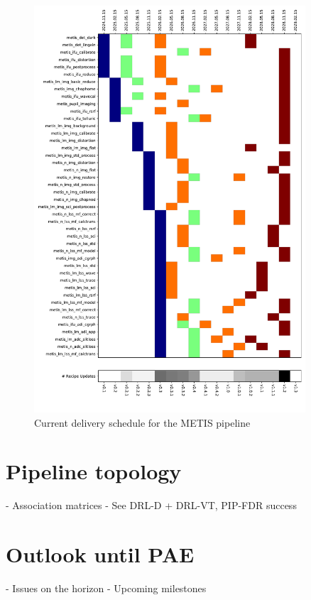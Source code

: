 \documentclass[a4paper]{spie}  %
\begin{document}
\begin{figure}
    \centering
    \includegraphics[width=0.9\textwidth]{SPIE_paper/figures/deliveries_recipes.pdf}
    \caption{Current delivery schedule for the METIS pipeline}
    \label{fig:del_schedule}
\end{figure}

\section{Pipeline topology}
\label{sec:pip}
- Association matrices
- See DRL-D + DRL-VT, PIP-FDR success




\section{Outlook until PAE}
\label{sec:outlook}
- Issues on the horizon
- Upcoming milestones


\appendix    %

\acknowledgments %


\end{document}

